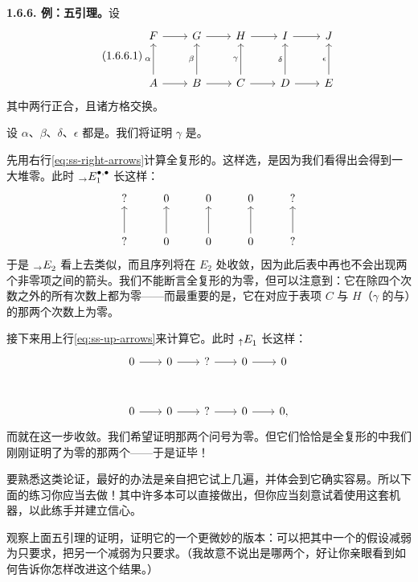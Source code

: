 \textbf{1.6.6. 例：五引理。}\quad 设
\begin{equation*}\tag{1.6.6.1}\label{eq:five-lemma-grid}
\begin{tikzcd}[row sep=2.8em, column sep=2.2em]
F \ar[r] & G \ar[r] & H \ar[r] & I \ar[r] & J \\
A \ar[u,"\alpha"] \ar[r] & B \ar[u,"\beta"] \ar[r] & C \ar[u,"\gamma"] \ar[r] & D \ar[u,"\delta"] \ar[r] & E \ar[u,"\epsilon"]
\end{tikzcd}
\end{equation*}
其中两行正合，且诸方格交换。

设 $\alpha$、$\beta$、$\delta$、$\epsilon$ 都是\trIsomorphism。我们将证明 $\gamma$ 是\trIsomorphism。

先用右行\trOrientation{}\eqref{eq:ss-right-arrows}计算全复形的\trCohomology。这样选，是因为我们看得出会得到一大堆零。此时 ${}_{\to}E^{\bullet,\bullet}_{1}$ 长这样：
\[
\begin{tikzcd}[row sep=2.4em, column sep=2.4em]
? & 0 & 0 & 0 & ? \\
? \ar[u] & 0 \ar[u] & 0 \ar[u] & 0 \ar[u] & ? \ar[u]
\end{tikzcd}
\]
于是 ${}_{\to}E^{}_{2}$ 看上去类似，而且序列将在 $E_{2}$ 处收敛，因为此后表中再也不会出现两个非零项之间的箭头。我们不能断言全复形的\trCohomology{}为零，但可以注意到：它在除四个次数之外的所有次数上都为零——而最重要的是，它在对应于表项 $C$ 与 $H$（$\gamma$ 的\trSource{}与\trTarget）的那两个次数上为零。

接下来用上行\trOrientation{}\eqref{eq:ss-up-arrows}来计算它。此时 ${}_{\uparrow}E^{}_{1}$ 长这样：
\[
\begin{tikzcd}[row sep=3.0em, column sep=2.0em]
0 \ar[r] & 0 \ar[r] & ? \ar[r] & 0 \ar[r] & 0 \\
0 \ar[r] & 0 \ar[r] & ? \ar[r] & 0 \ar[r] & 0,
\end{tikzcd}
\]
而\trSpectralSequence{}就在这一步收敛。我们希望证明那两个问号为零。但它们恰恰是全复形的\trCohomology{}中我们刚刚证明了为零的那两个——于是证毕！

要熟悉这类论证，最好的办法是亲自把它试上几遍，并体会到它确实容易。所以下面的练习你应当去做！其中许多本可以直接做出，但你应当刻意试着使用这套\trSpectralSequence{}机器，以此练手并建立信心。

\begin{exercise}[更微妙的五引理]\label{ex:five-lemma-weakening}
观察上面五引理的\trSpectralSequence{}证明，证明它的一个更微妙的版本：可以把其中一个\trIsomorphism{}的假设减弱为只要求\trInjection，把另一个减弱为只要求\trSurjectiveMap。（我故意不说出是哪两个，好让你亲眼看到\trSpectralSequence{}如何告诉你怎样改进这个结果。）
\end{exercise}


